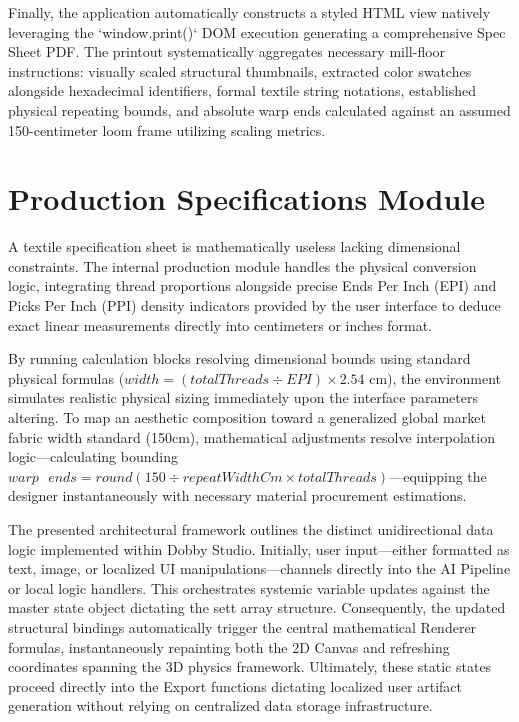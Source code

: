 Finally, the application automatically constructs a styled HTML view natively leveraging the `window.print()` DOM execution generating a comprehensive Spec Sheet PDF. The printout systematically aggregates necessary mill-floor instructions: visually scaled structural thumbnails, extracted color swatches alongside hexadecimal identifiers, formal textile string notations, established physical repeating bounds, and absolute warp ends calculated against an assumed 150-centimeter loom frame utilizing scaling metrics.

\section{Production Specifications Module}
A textile specification sheet is mathematically useless lacking dimensional constraints. The internal production module handles the physical conversion logic, integrating thread proportions alongside precise Ends Per Inch (EPI) and Picks Per Inch (PPI) density indicators provided by the user interface to deduce exact linear measurements directly into centimeters or inches format.

By running calculation blocks resolving dimensional bounds using standard physical formulas ($width = (totalThreads \div EPI) \times 2.54 \text{ cm}$), the environment simulates realistic physical sizing immediately upon the interface parameters altering. To map an aesthetic composition toward a generalized global market fabric width standard (150cm), mathematical adjustments resolve interpolation logic---calculating bounding $warp \text{ } ends = round(150 \div repeatWidthCm \times totalThreads)$---equipping the designer instantaneously with necessary material procurement estimations.

The presented architectural framework outlines the distinct unidirectional data logic implemented within Dobby Studio. Initially, user input---either formatted as text, image, or localized UI manipulations---channels directly into the AI Pipeline or local logic handlers. This orchestrates systemic variable updates against the master state object dictating the sett array structure. Consequently, the updated structural bindings automatically trigger the central mathematical Renderer formulas, instantaneously repainting both the 2D Canvas and refreshing coordinates spanning the 3D physics framework. Ultimately, these static states proceed directly into the Export functions dictating localized user artifact generation without relying on centralized data storage infrastructure. 
